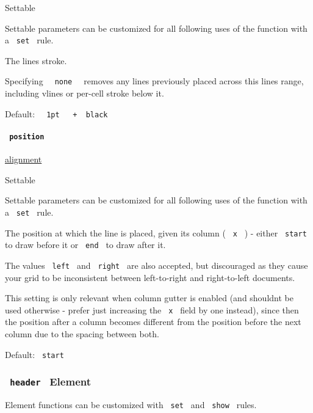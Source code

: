 {{ Settable }}

\label{definitions-vline-stroke-settable-tooltip}
Settable parameters can be customized for all following uses of the
function with a \texttt{\ set\ } rule.

The line\textquotesingle s stroke.

Specifying \texttt{\ }{\texttt{\ none\ }}\texttt{\ } removes any lines
previously placed across this line\textquotesingle s range, including
vlines or per-cell stroke below it.

Default:
\texttt{\ }{\texttt{\ 1pt\ }}\texttt{\ }{\texttt{\ +\ }}\texttt{\ black\ }

\paragraph{\texorpdfstring{\texttt{\ position\ }}{ position }}\label{definitions-vline-position}

\href{/docs/reference/layout/alignment/}{alignment}

{{ Settable }}

\label{definitions-vline-position-settable-tooltip}
Settable parameters can be customized for all following uses of the
function with a \texttt{\ set\ } rule.

The position at which the line is placed, given its column (
\texttt{\ x\ } ) - either \texttt{\ start\ } to draw before it or
\texttt{\ end\ } to draw after it.

The values \texttt{\ left\ } and \texttt{\ right\ } are also accepted,
but discouraged as they cause your grid to be inconsistent between
left-to-right and right-to-left documents.

This setting is only relevant when column gutter is enabled (and
shouldn\textquotesingle t be used otherwise - prefer just increasing the
\texttt{\ x\ } field by one instead), since then the position after a
column becomes different from the position before the next column due to
the spacing between both.

Default: \texttt{\ start\ }

\subsubsection{\texorpdfstring{\texttt{\ header\ } {{ Element
}}}{ header   Element }}\label{definitions-header}

\label{definitions-header-element-tooltip}
Element functions can be customized with \texttt{\ set\ } and
\texttt{\ show\ } rules.

